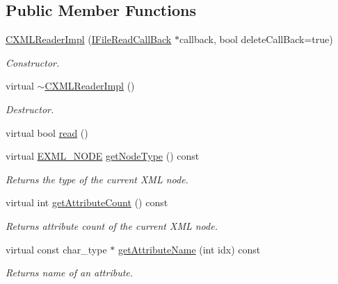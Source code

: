 \subsection*{Public Member Functions}
\begin{CompactItemize}
\item 
\hyperlink{classirr_1_1io_1_1_c_x_m_l_reader_impl_0566f930b8accdcdd4714f4b850f8a76}{CXMLReaderImpl} (\hyperlink{classirr_1_1io_1_1_i_file_read_call_back}{IFileReadCallBack} $\ast$callback, bool deleteCallBack=true)
\begin{CompactList}\small\item\em Constructor. \item\end{CompactList}\item 
virtual \hyperlink{classirr_1_1io_1_1_c_x_m_l_reader_impl_5306b209d836775bc2c5c286314c7e20}{$\sim$CXMLReaderImpl} ()
\begin{CompactList}\small\item\em Destructor. \item\end{CompactList}\item 
virtual bool \hyperlink{classirr_1_1io_1_1_c_x_m_l_reader_impl_bc3c451a40c816ce74c846ebc2e71417}{read} ()
\item 
virtual \hyperlink{namespaceirr_1_1io_86a02676c9cbb822e04d60c81b4f33ed}{EXML\_\-NODE} \hyperlink{classirr_1_1io_1_1_c_x_m_l_reader_impl_307110843c6946fa862da1f46244aecd}{getNodeType} () const 
\begin{CompactList}\small\item\em Returns the type of the current XML node. \item\end{CompactList}\item 
virtual int \hyperlink{classirr_1_1io_1_1_c_x_m_l_reader_impl_0e8003aa93f362dd118c735d8a98e8d5}{getAttributeCount} () const 
\begin{CompactList}\small\item\em Returns attribute count of the current XML node. \item\end{CompactList}\item 
virtual const char\_\-type $\ast$ \hyperlink{classirr_1_1io_1_1_c_x_m_l_reader_impl_fc1f65d70219634fc005a6048f898fb3}{getAttributeName} (int idx) const 
\begin{CompactList}\small\item\em Returns name of an attribute. \item\end{CompactList}\item 

\end{CompactItemize}
